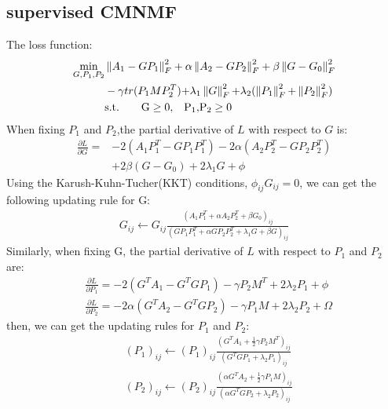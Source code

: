 \documentclass{bmcart}
\begin{document}
\subsection*{supervised CMNMF}
The loss function:
\begin{equation}\label{S-CMNMF}
\begin{split}
\mathop {\min }\limits_{G,{P_1},{P_2}}
&\left\| {{A_1} - G{P_1}} \right\|_F^2 + \alpha \left\| {{A_2} - G{P_2}} \right\|_F^2 +\beta\left\| {G - {G_0}}\right\|_F^2\\
&- \gamma tr({P_1}MP_2^T){\rm{ + }}{\lambda _1}\left\| G \right\|_F^2{\rm{ + }}{\lambda _2}(\left\| {{P_1}} \right\|_F^2{\rm{ + }}\left\| {{P_2}} \right\|_F^2)\\
&\mathrm{s.t. }\qquad {\rm{  G}} \ge {\rm{0, }}\quad{{\rm{P}}_1}{\rm{, }} {{\rm{P}}_2} \ge 0
\end{split}
\end{equation}
When fixing $P_1$ and $P_2$,the partial derivative of $L$ with respect to $G$ is:
\begin{equation}\label{S-CMNMF-gradient}
\begin{split}
\frac{\partial{L}}{\partial{G}}=
&-2(A_1{P_1^T} - G{P_1}{P_1^T})-2\alpha(A_2{P_2^T} - G{P_2}{P_2^T})\\
&+2\beta(G-G_0)+2\lambda_1G+\phi
\end{split}
\end{equation}
Using the Karush-Kuhn-Tucher(KKT) conditions, $\phi_{ij}G_{ij}=0$, we can get the following updating rule for G:
\begin{equation}\label{updating_G}
\begin{split}
G_{ij}\leftarrow G_{ij}
\frac{(A_1P_1^T+\alpha A_2P_2^T+\beta G_0)_{ij}}
{(GP_1P_1^T+\alpha GP_2P_2^T+\lambda_1G+\beta G)_{ij}}
\end{split}
\end{equation}
Similarly, when fixing G, the partial derivative of $L$ with respect to $P_1$ and $P_2$ are:
\begin{equation}\label{derivate_P}
\begin{split}
&\frac{\partial{L}}{\partial{P_1}}=
-2(G^TA_1-{G^TGP_1})-\gamma P_2M^T +2\lambda_2P_1+\phi\\
&\frac{\partial{L}}{\partial{P_2}}=
-2\alpha(G^TA_2-{G^TGP_2})-\gamma P_1M +2\lambda_2P_2+\Omega
\end{split}
\end{equation}
then, we can get the updating rules for $P_1$ and $P_2$:
\begin{equation}\label{updating_P}
\begin{split}
&(P_1)_{ij}\leftarrow (P_1)_{ij}
\frac{(G^TA_1+\frac{1}{2}\gamma P_2M^T)_{ij}}
{(G^TGP_1+\lambda_2P_1)_{ij}}\\
&(P_2)_{ij}\leftarrow (P_2)_{ij}
\frac{(\alpha G^TA_2+\frac{1}{2}\gamma P_1M)_{ij}}
{(\alpha G^TGP_2 + \lambda_2P_2)_{ij}}
\end{split}
\end{equation}
\end{document}
